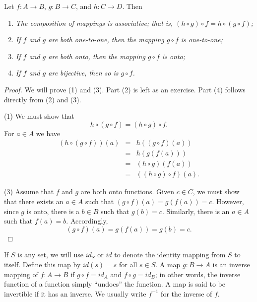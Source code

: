 \begin{theorem}\label{sets_theorem_mapping_properties}
Let $f : A \rightarrow B$, $g : B \rightarrow C$, and $h : C \rightarrow D$. Then  
\begin{enumerate}
 
\rm \item \it
The composition of mappings is associative; that is, $(h \circ g) \circ f = h \circ (g \circ f)$;  
 
\rm \item \it
If $f$ and $g$ are both one-to-one, then the mapping $g \circ f$ is one-to-one; 
 
\rm \item \it
If $f$ and $g$ are both onto, then the mapping $g \circ f$ is onto;  
 
\rm \item \it
If $f$ and $g$ are bijective, then so is $g \circ f$.
 
\end{enumerate}
\end{theorem}
 
\begin{proof}
We will prove (1) and (3). Part (2) is left as an exercise.  Part (4) follows directly from (2) and (3). 
 
(1) 
We must show that
$$
h \circ (g \circ f) = (h \circ g) \circ f.
$$
For $a \in A$ we have
\begin{eqnarray*}
(h \circ (g \circ f))(a) & = & h((g \circ f)(a)) \\
& = & h(g(f(a)))  \\
& = & (h \circ g)(f(a)) \\
& = & ((h \circ g) \circ f)(a).
\end{eqnarray*}
 
(3) 
Assume that $f$ and $g$ are both onto functions.  Given $c \in C$, we must show that there exists an $a \in A$ such that $(g \circ f)(a) = g(f(a)) = c$.  However, since $g$ is onto, there is a $b \in B$ such that $g(b) = c$.  Similarly, there is an $a \in A$ such that $f(a) = b$.  Accordingly, 
$$
(g \circ f)(a) = g(f(a)) = g(b) = c.
$$
\end{proof}
 
\medskip
 
If $S$ is any set, we will use $id_S$ or $id$\label{sets_identity} to denote the {\bfi identity mapping\/} from $S$ to itself.  Define this map by $id(s) = s$ for all $s \in S$.  A map $g: B \rightarrow A$ is an {\bfi inverse mapping\/} of $f: A \rightarrow B$ if $g \circ f = id_A$ and $f \circ g = id_B$; in other words, the inverse function of a function simply ``undoes'' the function.   A map is said to be {\bfi invertible\/} if it has an inverse.  We usually write $f^{-1}$ for the inverse of $f$.  

